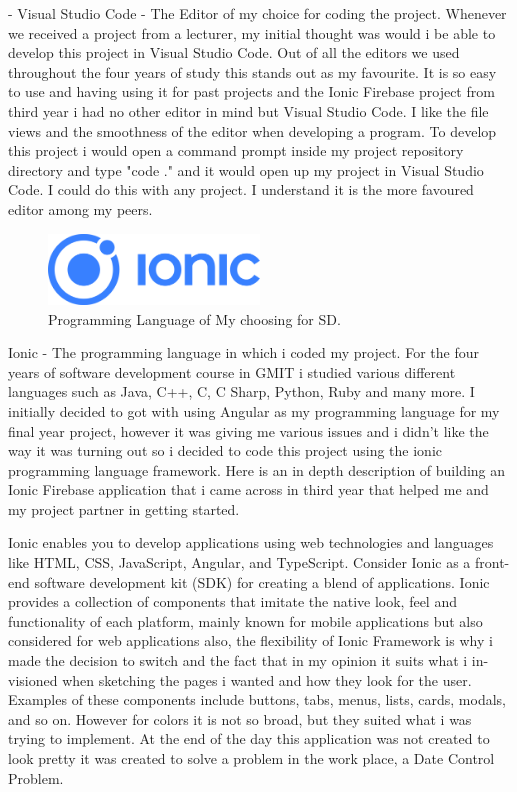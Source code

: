 - Visual Studio Code - The Editor of my choice for coding the project.
\newline
Whenever we received a project from a lecturer, my initial thought was would i be able to develop this project in Visual Studio Code. Out of all the editors we used throughout the four years of study this stands out as my favourite. It is so easy to use and having using it for past projects and the Ionic Firebase project from third year i had no other editor in mind but Visual Studio Code. I like the file views and the smoothness of the editor when developing a program. To develop this project i would open a command prompt inside my project repository directory and type "code ." and it would open up my project in Visual Studio Code. I could do this with any project. I understand it is the more favoured editor among my peers. 
\newline

\begin{figure}[h!]
	\caption{Programming Language of My choosing for SD.}
	\label{image:ionic}
	\centering
	\includegraphics[width=0.5\textwidth]{images/ionic.png}
\end{figure}
Ionic - The programming language in which i coded my project. For  the four years of software development course in GMIT i studied various different languages such as Java, C++, C, C Sharp, Python, Ruby and many more. I initially decided to got with using Angular as my programming language for my final year project, however it was giving me various issues and i didn't like the way it was turning out so i decided to code this project using the ionic programming language framework. \cite{cheng2018build} Here is an in depth description of building an Ionic Firebase application that i came across in third year that helped me and my project partner in getting started. 
\newline

Ionic enables you to develop applications using web technologies and languages like HTML, CSS, JavaScript, Angular, and TypeScript. Consider Ionic as a front-end software development kit (SDK) for creating a blend of applications. Ionic provides a collection of components that imitate the native look, feel and functionality of each platform, mainly known for mobile applications but also considered for web applications also, the flexibility of Ionic Framework is why i made the decision to switch and the fact that in my opinion it suits what i in-visioned when sketching the pages i wanted and how they look for the user. Examples of these components include buttons, tabs, menus, lists, cards, modals, and so on. However for colors it is not so broad, but they suited what i was trying to implement. At the end of the day this application was not created to look pretty it was created to solve a problem in the work place, a Date Control Problem.
\newline

